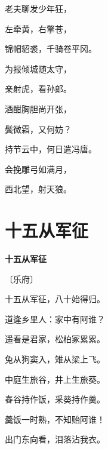 \documentclass[12pt,UTF-8,openany,fontset=none]{ctexbook}
\begin{document}
\begin{center}
    \begin{Large}

        老夫聊发少年狂，

        左牵黄，右擎苍，

        锦帽貂裘，千骑卷平冈。

        为报倾城随太守，

        亲射虎，看孙郎。

        \vspace{18pt}  %

        酒酣胸胆尚开张，

        鬓微霜，又何妨？

        持节云中，何日遣冯唐。

        会挽雕弓如满月，

        西北望，射天狼。

    \end{Large}

\end{center}

\vspace{8pt}
\clearpage

\section{十五从军征}


\begin{center}
    {\bfseries 十五从军征}

    \vspace{18pt}

    \begin{large}\xuwen
        〔乐府〕
    \end{large}

\end{center}

    \vspace{18pt}  %

\begin{center}
    \begin{Large}

        十五从军征，八十始得归。

        道逢乡里人：家中有阿谁？

        遥看是君家，松柏冢累累。

        兔从狗窦入，雉从梁上飞。

        中庭生旅谷，井上生旅葵。

        舂谷持作饭，采葵持作羹。

        羹饭一时熟，不知贻阿谁！

        出门东向看，泪落沾我衣。

    \end{Large}

\end{center}
\end{document}
